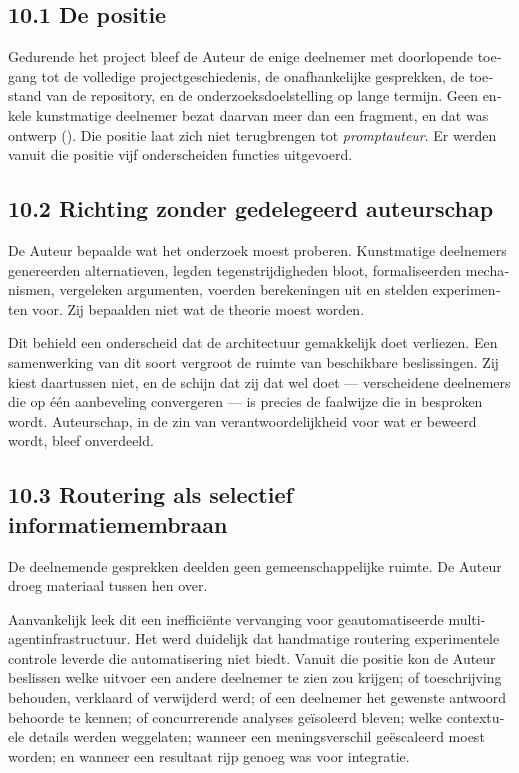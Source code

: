 \begin{dutch}
\subsection*{10.1 De positie}
\label{sec:nl:10.1}

Gedurende het project bleef de Auteur de enige deelnemer met doorlopende toegang tot de volledige projectgeschiedenis, de onafhankelijke gesprekken, de toestand van de repository, en de onderzoeksdoelstelling op lange termijn. Geen enkele kunstmatige deelnemer bezat daarvan meer dan een fragment, en dat was ontwerp (). Die positie laat zich niet terugbrengen tot \emph{promptauteur}. Er werden vanuit die positie vijf onderscheiden functies uitgevoerd.


\subsection*{10.2 Richting zonder gedelegeerd auteurschap}
\label{sec:nl:10.2}

De Auteur bepaalde wat het onderzoek moest proberen. Kunstmatige deelnemers genereerden alternatieven, legden tegenstrijdigheden bloot, formaliseerden mechanismen, vergeleken argumenten, voerden berekeningen uit en stelden experimenten voor. Zij bepaalden niet wat de theorie moest worden.

Dit behield een onderscheid dat de architectuur gemakkelijk doet verliezen. Een samenwerking van dit soort vergroot de ruimte van beschikbare beslissingen. Zij kiest daartussen niet, en de schijn dat zij dat wel doet — verscheidene deelnemers die op één aanbeveling convergeren — is precies de faalwijze die in  besproken wordt. Auteurschap, in de zin van verantwoordelijkheid voor wat er beweerd wordt, bleef onverdeeld.


\subsection*{10.3 Routering als selectief informatiemembraan}
\label{sec:nl:10.3}

De deelnemende gesprekken deelden geen gemeenschappelijke ruimte. De Auteur droeg materiaal tussen hen over.

Aanvankelijk leek dit een inefficiënte vervanging voor geautomatiseerde multi-agentinfrastructuur. Het werd duidelijk dat handmatige routering experimentele controle leverde die automatisering niet biedt. Vanuit die positie kon de Auteur beslissen welke uitvoer een andere deelnemer te zien zou krijgen; of toeschrijving behouden, verklaard of verwijderd werd; of een deelnemer het gewenste antwoord behoorde te kennen; of concurrerende analyses geïsoleerd bleven; welke contextuele details werden weggelaten; wanneer een meningsverschil geëscaleerd moest worden; en wanneer een resultaat rijp genoeg was voor integratie.


\end{dutch}
